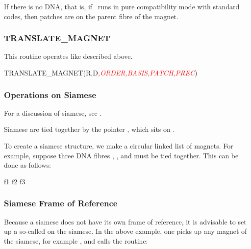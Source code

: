If there is no DNA, that is, if \PTC\ runs in pure compatibility mode
with standard codes, then patches are on the parent fibre of the magnet.


\subsubsection*{TRANSLATE\_MAGNET}

%
This routine operates like  described above.

\begin{ptccode}
TRANSLATE_MAGNET(R,D\textit{\textcolor{red}{,ORDER,BASIS,PATCH,PREC}})
\end{ptccode}


\subsubsection{Operations on Siamese}
\label{sec:ops.siamese}

For a discussion of siamese, see .

%
Siamese are tied together by the pointer , which
sits on .

%
To create a siamese structure, we make a circular linked list of magnets.
For example, suppose three DNA fibres , , and  must
be tied together. This can be done as follows:

\begin{ptccode}
f1%
f2%
f3%
\end{ptccode}


\subsubsection*{Siamese Frame of Reference}

%
Because a siamese does not have its own frame of reference, it is 
advisable to set up a so-called  on the siamese.
In the above example, one picks up any magnet of the siamese,
for example , and calls the routine:

